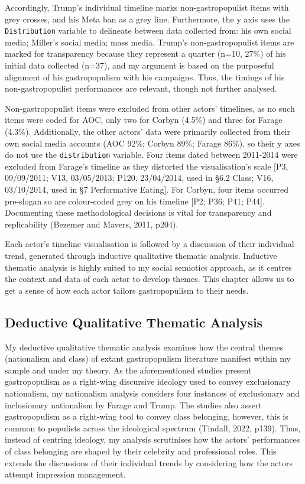 \documentclass[a4paper, nobind]{templates/ociamthesis}
\begin{document}
Accordingly, Trump's individual timeline marks non-gastropopulist items with grey crosses, and his Meta ban as a grey line. Furthermore, the y axis uses the \texttt{Distribution} variable to delineate between data collected from: his own social media; Miller's social media; mass media. Trump's non-gastropopulist items are marked for transparency because they represent a quarter (n=10, 27\%) of his initial data collected (n=37), and my argument is based on the purposeful alignment of his gastropopulism with his campaigns. Thus, the timings of his non-gastropopulist performances are relevant, though not further analysed.

Non-gastropopulist items were excluded from other actors' timelines, as no such items were coded for AOC, only two for Corbyn (4.5\%) and three for Farage (4.3\%). Additionally, the other actors' data were primarily collected from their own social media accounts (AOC 92\%; Corbyn 89\%; Farage 86\%), so their y axes do not use the \texttt{distribution} variable. Four items dated between 2011-2014 were excluded from Farage's timeline as they distorted the visualisation's scale {[}P3, 09/09/2011; V13, 03/05/2013; P120, 23/04/2014, used in §6.2 Class; V16, 03/10/2014, used in §7 Performative Eating{]}. For Corbyn, four items occurred pre-slogan so are colour-coded grey on his timeline {[}P2; P36; P41; P44{]}. Documenting these methodological decisions is vital for transparency and replicability (Bezemer and Mavers, 2011, p204).

Each actor's timeline visualisation is followed by a discussion of their individual trend, generated through inductive qualitative thematic analysis. Inductive thematic analysis is highly suited to my social semiotics approach, as it centres the context and data of each actor to develop themes. This chapter allows us to get a sense of how each actor tailors gastropopulism to their needs.

\hypertarget{deductive-qualitative-thematic-analysis}{%
\subsection*{Deductive Qualitative Thematic Analysis}\label{deductive-qualitative-thematic-analysis}}

My deductive qualitative thematic analysis examines how the central themes (nationalism and class) of extant gastropopulism literature manifest within my sample and under my theory. As the aforementioned studies present gastropopulism as a right-wing discursive ideology used to convey exclusionary nationalism, my nationalism analysis considers four instances of exclusionary and inclusionary nationalism by Farage and Trump. The studies also assert gastropopulism as a right-wing tool to convey class belonging, however, this is common to populists across the ideological spectrum (Tindall, 2022, p139). Thus, instead of centring ideology, my analysis scrutinises how the actors' performances of class belonging are shaped by their celebrity and professional roles. This extends the discussions of their individual trends by considering how the actors attempt impression management.
\end{document}
